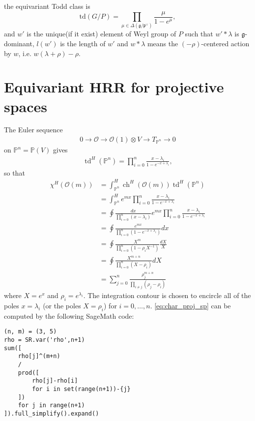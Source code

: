 \documentclass[uplatex,dvipdfmx]{jsarticle}
\newcommand{\ch}[1]{\mathrm{ch}\left( {#1} \right)}
\newcommand{\td}[1]{\mathrm{td}\left( {#1} \right)}
\begin{document}
the equivariant Todd class is
\begin{equation}
    \td{G/P} = \prod_{\mu \in \Delta(\mathfrak{g}/\mathfrak{p}^\vee)}
    \frac{\mu}{1 - e^\mu},
\end{equation}
and
$w'$
is the unique(if it exist) element of Weyl group of
$P$
such that
$w' * \lambda$
is
$\mathfrak{g}$-dominant,
$l(w')$
is the length of
$w'$
and
$w *\lambda$
means the
$(-\rho)$-centered
action by
$w$,
i.e.
$w(\lambda + \rho) - \rho$.

\section{Equivariant HRR for projective spaces}

\newcommand{\cO}{\mathcal{O}}
\newcommand{\bP}{\mathbb{P}}
\renewcommand{\td}{\operatorname{td}}
\renewcommand{\ch}{\operatorname{ch}}
\newcommand{\Res}{\operatorname{Res}}

The Euler sequence
\begin{align}
0 \to \cO \to \cO(1) \otimes V \to T_{\bP^n} \to 0
\end{align}
on $\bP^n = \bP(V)$
gives
\begin{align}
\td^H (\bP^n)
=
\prod_{i=0}^n
\frac{x-\lambda_i}{1-e^{-x+\lambda_i}},
\end{align}
so that
\begin{align}
\chi^H(\cO(m))
&=
\int^H_{\bP^n}
\ch^H(\cO(m)) \td^H(\bP^n)
\\
&=
\int^H_{\bP^n}
e^{m x}
\prod_{i=0}^n \frac{x-\lambda_i}{1-e^{-x+\lambda_i}}
\\
&=
\oint
\frac{d x}{\prod_{i=0}^n (x-\lambda_i)}
e^{m x}
\prod_{i=0}^n \frac{x-\lambda_i}{1-e^{-x+\lambda_i}}
\\
&=
\oint
\frac{e^{m x}}{
\prod_{i=0}^n (1-e^{-x+\lambda_i})
} d x
\\
&=
\oint
\frac{X^m}{
\prod_{i=0}^n (1-\rho_i X^{-1})
}
\frac{d X}{X}
\\
&=
\oint
\frac{X^{m+n}}{
\prod_{i=0}^n (X-\rho_i)
}
d X
\\
&=
\sum_{j=0}^n
\frac{\rho_j^{m+n}}
{\prod_{i \ne j} (\rho_j - \rho_i)}
\label{eq:char_proj_sp}
\end{align}
where
$
X = e^x
$
and
$
\rho_i = e^{\lambda_i}.
$
The integration contour is chosen to encircle
all of the poles $x = \lambda_i$
(or the poles $X = \rho_i$)
for $i = 0, \ldots, n$.
\eqref{eq:char_proj_sp} can be computed
by the following SageMath code:
\begin{verbatim}
(n, m) = (3, 5)
rho = SR.var('rho',n+1)
sum([
    rho[j]^(m+n)
    /
    prod([
        rho[j]-rho[i]
        for i in set(range(n+1))-{j}
    ])
    for j in range(n+1)
]).full_simplify().expand()
\end{verbatim}
\end{document}
